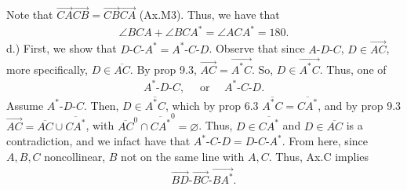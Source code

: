 \documentclass{report}
\begin{document}
    Note that $\overrightarrow{CA}\overrightarrow{CB}  = \overrightarrow{CB}\overrightarrow{CA}$ (Ax.M3). Thus, we have that
    \begin{align*}
        \angle BCA + \angle BCA^{*} = \angle ACA^{*} = 180
    .\end{align*}
    \bigbreak \noindent 
    d.) First, we show that $ D\text{-}C\text{-}A^{*} = A^{*}\text{-}C\text{-}D$. Observe that since $ A\text{-}D\text{-}C$, $D \in \overrightarrow{AC}$, more specifically, $ D \in \overline{AC}$. By prop 9.3, $ \overrightarrow{AC} = \overrightarrow{A^{*}C}$. So, $D \in \overrightarrow{A^{*}C}$. Thus, one of 
    \begin{align*}
        A^{*}\text{-}D\text{-}C, \quad \text{ or } \quad A^{*}\text{-}C\text{-}D
    .\end{align*}
    Assume $ A^{*}\text{-}D\text{-}C$. Then, $D \in \overline{A^{*}C}$, which by prop 6.3  $\overline{A^{*}C} = \overline{CA^{*}}$, and by prop 9.3 $\overrightarrow{AC} = \overline{AC} \cup \overline{CA^{*}}$, with $ \overline{AC}^{0} \cap \overline{CA^{*}}^{0} = \varnothing$. Thus, $D \in \overline{CA^{*}}$ and $ D \in \overline{AC} $ is a contradiction, and we infact have that $ A^{*}\text{-}C\text{-}D = D\text{-}C\text{-}A^{*}$. 
    \bigbreak \noindent 
    From here, since $A,B,C$ noncollinear, $B$ not on the same line with $A,C$. Thus, Ax.C implies
    \begin{align*}
        \overrightarrow{BD}\text{-}\overrightarrow{BC}\text{-}\overrightarrow{BA^{*}}
    .\end{align*}
    \endpf
\end{document}
